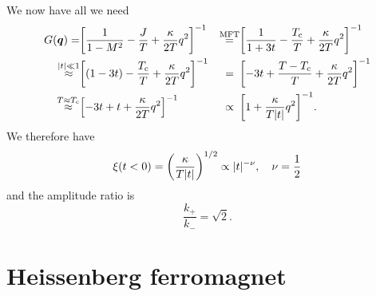 \documentclass[11pt,letter, swedish, english
]{article}
\newcommand{\Tc}{\ensuremath{T_{\text{c}}}}
\begin{document}
We now have all we need
\begin{equation}
\begin{aligned}
G(\vb*q)=&\qty[\frac{1}{1-M^2}-\frac{J}{T}+\frac{\kappa}{2T}q^2]^{-1}
&\stackrel{\text{MFT}}{=}&
\qty[\frac{1}{1+3t}-\frac{\Tc}{T}+\frac{\kappa}{2T}q^2]^{-1}\\
\stackrel{|t|\ll1}{\approx}&
\qty[(1-3t)-\frac{\Tc}{T}+\frac{\kappa}{2T}q^2]^{-1}
&=\hspace{5pt}&
\qty[-3t+\frac{T-\Tc}{T}+\frac{\kappa}{2T}q^2]^{-1}\\
\stackrel{T\approx\Tc}{\approx}&
\qty[-3t+t+\frac{\kappa}{2T}q^2]^{-1}
&\propto\hspace{5pt}&
\qty[1+\frac{\kappa}{T|t|}q^2]^{-1}.
\end{aligned}
\end{equation}
We therefore have
\begin{equation}
\xi(t<0)=\qty(\frac{\kappa}{T|t|})^{1/2}
\propto |t|^{-\nu}\qcomma \nu=\frac{1}{2}
\end{equation}
and the amplitude ratio is
\begin{equation}
\frac{k_+}{k_-}=\sqrt{2}.
\end{equation}





\section{Heissenberg ferromagnet}
\end{document}
